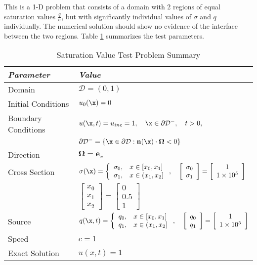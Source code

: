This is a 1-D problem that consists of a domain with 2 regions of equal
saturation values $\frac{q}{\sigma}$, but with significantly individual values
of $\sigma$ and $q$ individually. The numerical solution should show no
evidence of the interface between the two regions.
Table \ref{tab:saturation} summarizes the test parameters.

\begin{table}[h]\caption{Saturation Value Test Problem Summary}
\label{tab:saturation}
\centering
\begin{tabular}{l l}\toprule
\emph{Parameter} & \emph{Value}\\\midrule
Domain & $\mathcal{D} = (0,1)$\\
Initial Conditions & $u_0(\x)=0$\\
Boundary Conditions & $u(\x,t)=u_{inc}=1,\quad \x\in\partial\mathcal{D}^-,\quad t>0,$\\
   & $\partial\mathcal{D}^-=\{\x\in\partial\mathcal{D}:\mathbf{n}(\x)
     \cdot\mathbf{\Omega}<0\}$\\
Direction & $\mathbf{\Omega} = \mathbf{e}_x$\\
Cross Section & $\sigma(\x)=\left\{\begin{array}{c l}
   \sigma_0, & x\in[x_0,x_1]\\
   \sigma_1, & x\in(x_1,x_2]
   \end{array}\right.,\quad
   \left[\begin{array}{c}\sigma_0\\\sigma_1\end{array}\right] =
      \left[\begin{array}{c}1\\1\times 10^5\end{array}\right]$\\
   & $\left[\begin{array}{c}x_0\\x_1\\x_2\end{array}\right] =
      \left[\begin{array}{c}0\\0.5\\1\end{array}\right]$\\
Source & $q(\x,t)=\left\{\begin{array}{c l}
   q_0, & x\in[x_0,x_1]\\
   q_1, & x\in(x_1,x_2]
   \end{array}\right.,\quad
   \left[\begin{array}{c}q_0\\q_1\end{array}\right] =
      \left[\begin{array}{c}1\\1\times 10^5\end{array}\right]$\\
Speed & $c=1$\\
Exact Solution & $u(x,t) = 1$ \\
\bottomrule\end{tabular}
\end{table}
